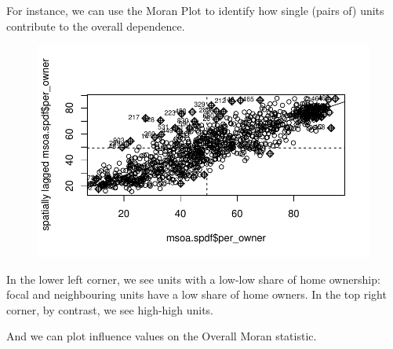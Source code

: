 \documentclass[
  letterpaper,
  DIV=11,
  numbers=noendperiod]{scrreprt}
\newenvironment{Shaded}{\begin{snugshade}}{\end{snugshade}}
\newcommand{\FunctionTok}[1]{\textcolor[rgb]{0.28,0.35,0.67}{#1}}
\newcommand{\NormalTok}[1]{\textcolor[rgb]{0.00,0.23,0.31}{#1}}
\newcommand{\OtherTok}[1]{\textcolor[rgb]{0.00,0.23,0.31}{#1}}
\newcommand{\SpecialCharTok}[1]{\textcolor[rgb]{0.37,0.37,0.37}{#1}}
\begin{document}
For instance, we can use the Moran Plot to identify how single (pairs
of) units contribute to the overall dependence.

\begin{Shaded}
\end{Shaded}

\begin{figure}[H]

{\centering \includegraphics{04_dependence_files/figure-pdf/unnamed-chunk-13-1.pdf}

}

\end{figure}

In the lower left corner, we see units with a low-low share of home
ownership: focal and neighbouring units have a low share of home owners.
In the top right corner, by contrast, we see high-high units.

And we can plot influence values on the Overall Moran statistic.
\end{document}
